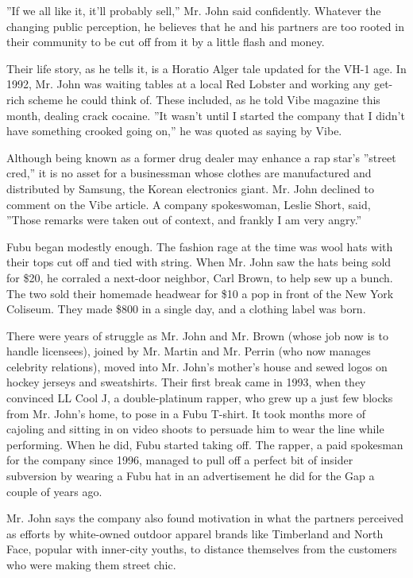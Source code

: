 ''If we all like it, it'll probably sell,'' Mr. John said confidently.
Whatever the changing public perception, he believes that he and his
partners are too rooted in their community to be cut off from it by a
little flash and money.

Their life story, as he tells it, is a Horatio Alger tale updated for
the VH-1 age. In 1992, Mr. John was waiting tables at a local Red
Lobster and working any get-rich scheme he could think of. These
included, as he told Vibe magazine this month, dealing crack cocaine.
''It wasn't until I started the company that I didn't have something
crooked going on,'' he was quoted as saying by Vibe.

Although being known as a former drug dealer may enhance a rap star's
''street cred,'' it is no asset for a businessman whose clothes are
manufactured and distributed by Samsung, the Korean electronics giant.
Mr. John declined to comment on the Vibe article. A company spokeswoman,
Leslie Short, said, ''Those remarks were taken out of context, and
frankly I am very angry.''

Fubu began modestly enough. The fashion rage at the time was wool hats
with their tops cut off and tied with string. When Mr. John saw the hats
being sold for \$20, he corraled a next-door neighbor, Carl Brown, to
help sew up a bunch. The two sold their homemade headwear for \$10 a pop
in front of the New York Coliseum. They made \$800 in a single day, and
a clothing label was born.

There were years of struggle as Mr. John and Mr. Brown (whose job now is
to handle licensees), joined by Mr. Martin and Mr. Perrin (who now
manages celebrity relations), moved into Mr. John's mother's house and
sewed logos on hockey jerseys and sweatshirts. Their first break came in
1993, when they convinced LL Cool J, a double-platinum rapper, who grew
up a just few blocks from Mr. John's home, to pose in a Fubu T-shirt. It
took months more of cajoling and sitting in on video shoots to persuade
him to wear the line while performing. When he did, Fubu started taking
off. The rapper, a paid spokesman for the company since 1996, managed to
pull off a perfect bit of insider subversion by wearing a Fubu hat in an
advertisement he did for the Gap a couple of years ago.

Mr. John says the company also found motivation in what the partners
perceived as efforts by white-owned outdoor apparel brands like
Timberland and North Face, popular with inner-city youths, to distance
themselves from the customers who were making them street chic.

